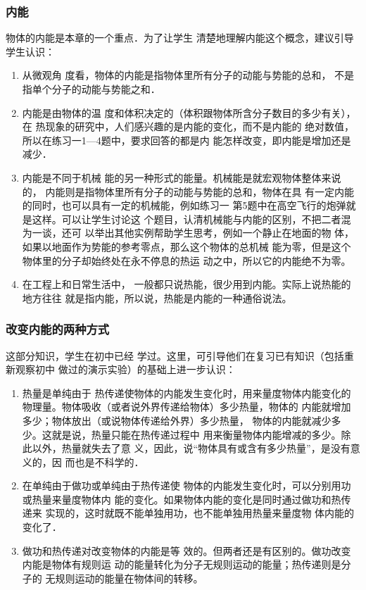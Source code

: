 \subsubsection{内能}

物体的内能是本章的一个重点．为了让学生
清楚地理解内能这个概念，建议引导学生认识：
\begin{enumerate}
\item 从微观角
度看，物体的内能是指物体里所有分子的动能与势能的总和，
不是指单个分子的动能与势能之和．   
 \item 内能是由物体的温
度和体积决定的（体积跟物体所含分子数目的多少有关），在
热现象的研究中，人们感兴趣的是内能的变化，而不是内能的
绝对数值，所以在练习一1—4题中，要求回答的都是内
能怎样改变，即内能是增加还是减少．   
 \item 内能是不同于机械
能的另一种形式的能量。机械能是就宏观物体整体来说的，
内能则是指物体里所有分子的动能与势能的总和，物体在具
有一定内能的同时，也可以具有一定的机械能，例如练习一
第5题中在高空飞行的炮弹就是这样。可以让学生讨论这
个题目，认清机械能与内能的区别，不把二者混为一谈，还可
以举出其他实例帮助学生思考，例如一个静止在地面的物
体，如果以地面作为势能的参考零点，那么这个物体的总机械
能为零，但是这个物体里的分子却始终处在永不停息的热运
动之中，所以它的内能绝不为零。 
\item 在工程上和日常生活中，
一般都只说热能，很少用到内能。实际上说热能的地方往往
就是指内能，所以说，热能是内能的一种通俗说法。
\end{enumerate}

\subsubsection{改变内能的两种方式} 这部分知识，学生在初中已经
学过。这里，可引导他们在复习已有知识（包括重新观察初中
做过的演示实验）的基础上进一步认识：
\begin{enumerate}
\item 热量是单纯由于
热传递使物体的内能发生变化时，用来量度物体内能变化的
物理量。物体吸收（或者说外界传递给物体）多少热量，物体的
内能就增加多少；物体放出（或说物体传递给外界）多少热量，
物体的内能就减少多少。这就是说，热量只能在热传递过程中
用来衡量物体内能增减的多少。除此以外，热量就失去了意
义，因此，说“物体具有或含有多少热量”，是没有意义的，因
而也是不科学的．    \item 在单纯由于做功或单纯由于热传递使
物体的内能发生变化时，可以分别用功或热量来量度物体内
能的变化。如果物体内能的变化是同时通过做功和热传递来
实现的，这时就既不能单独用功，也不能单独用热量来量度物
体内能的变化了．    \item 做功和热传递对改变物体的内能是等
效的。但两者还是有区别的。做功改变内能是物体有规则运
动的能量转化为分子无规则运动的能量；热传递则是分子的
无规则运动的能量在物体间的转移。
\end{enumerate}

